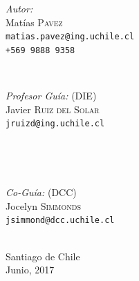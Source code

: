\documentclass[ 12pt,letterpaper,spanish]{book}
\begin{document}
\begin{titlepage}
\begin{minipage}{0.4\textwidth}
\begin{flushleft} \large
\emph{Autor:}\\
Matías \textsc{Pavez}\\
\texttt{\normalsize matias.pavez@ing.uchile.cl} \\
\texttt{\normalsize +569 9888 9358}
\end{flushleft}
\end{minipage}
~
\begin{minipage}{0.4\textwidth}
\begin{flushright} \large
\emph{Profesor Guía:} (DIE) \\
Javier \textsc{Ruiz del Solar}\\
\texttt{\normalsize jruizd@ing.uchile.cl}
\end{flushright}
\end{minipage}\\[1cm]
\begin{minipage}{0.4\textwidth}
\begin{flushleft}\end{flushleft}
\end{minipage}
~
\begin{minipage}{0.4\textwidth}
\begin{flushright} \large
\emph{Co-Guía:} (DCC)\\
Jocelyn \textsc{Simmonds}\\
\texttt{\normalsize jsimmond@dcc.uchile.cl}
\end{flushright}
\end{minipage}\\[2cm]
{\large Santiago de Chile}\\
{\large Junio, 2017}
\vfill
 
\end{titlepage}

\tableofcontents








\end{document}
